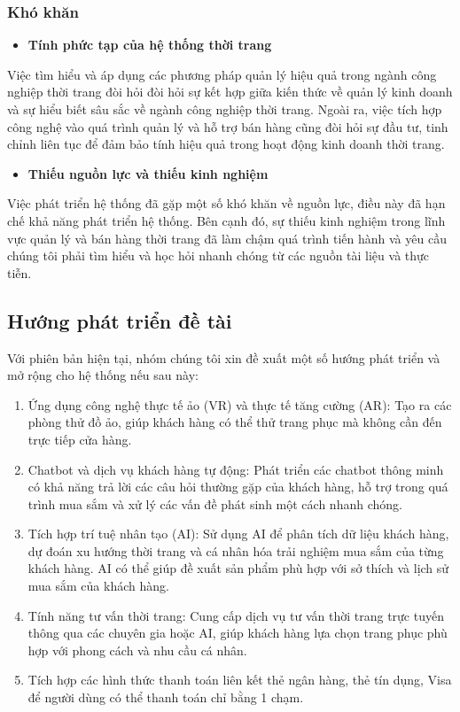 \subsubsection{Khó khăn}
\begin{itemize}
    \item \textbf{Tính phức tạp của hệ thống thời trang}
\end{itemize}
Việc tìm hiểu và áp dụng các phương pháp quản lý hiệu quả trong ngành công nghiệp thời trang đòi hỏi đòi hỏi sự kết hợp giữa kiến thức về quản lý kinh doanh và sự hiểu biết sâu sắc về ngành công nghiệp thời trang. Ngoài ra, việc tích hợp công nghệ vào quá trình quản lý và hỗ trợ bán hàng cũng đòi hỏi sự đầu tư, tinh chỉnh liên tục để đảm bảo tính hiệu quả trong hoạt động kinh doanh thời trang.
\begin{itemize}
    \item \textbf{Thiếu nguồn lực và thiếu kinh nghiệm}
\end{itemize}
Việc phát triển hệ thống đã gặp một số khó
khăn về nguồn lực, điều này đã hạn chế khả năng phát triển hệ thống. Bên cạnh đó, sự thiếu kinh nghiệm trong lĩnh vực quản lý và bán hàng thời trang đã làm chậm quá trình tiến hành và yêu cầu chúng tôi phải tìm hiểu và học hỏi nhanh chóng từ các nguồn tài liệu và thực tiễn.
\subsection{Hướng phát triển đề tài}
Với phiên bản hiện tại, nhóm chúng tôi xin đề xuất một số hướng phát triển và mở rộng cho hệ thống nếu sau này:
\begin{enumerate}[-]
\item Ứng dụng công nghệ thực tế ảo (VR) và thực tế tăng cường (AR): Tạo ra các phòng thử đồ ảo, giúp khách hàng có thể thử trang phục mà không cần đến trực tiếp cửa hàng.
\item Chatbot và dịch vụ khách hàng tự động: Phát triển các chatbot thông minh có khả năng trả lời các câu hỏi thường gặp của khách hàng, hỗ trợ trong quá trình mua sắm và xử lý các vấn đề phát sinh một cách nhanh chóng.
\item Tích hợp trí tuệ nhân tạo (AI): Sử dụng AI để phân tích dữ liệu khách hàng, dự đoán xu hướng thời trang và cá nhân hóa trải nghiệm mua sắm của từng khách hàng. AI có thể giúp đề xuất sản phẩm phù hợp với sở thích và lịch sử mua sắm của khách hàng.
\item Tính năng tư vấn thời trang: Cung cấp dịch vụ tư vấn thời trang trực tuyến thông qua các chuyên gia hoặc AI, giúp khách hàng lựa chọn trang phục phù hợp với phong cách và nhu cầu cá nhân.
\item Tích hợp các hình thức thanh toán liên kết thẻ ngân hàng, thẻ tín dụng, Visa để người dùng có thể thanh toán chỉ bằng 1 chạm.

\end{enumerate}
